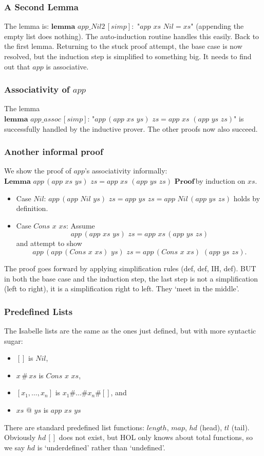 \documentclass{article}
\newcommand{\qq}{\texttt{"}}
\begin{document}
\subsubsection*{A Second Lemma}
The lemma is:
$\textbf{lemma}\,\,app\_Nil2\,[simp]:\,\,\qq app\,\,xs\,\,Nil=xs\qq $
(appending the empty list does nothing). The auto-induction routine handles this easily. Back to the first lemma.
Returning to the stuck proof attempt, the base case is now resolved, but the induction step is simplified to something big. It needs to find out that $app$ is associative.
\subsubsection*{Associativity of $app$}
The lemma 
$\textbf{lemma}\,\,app\_assoc\,[simp]:\,\qq app\,(app\,\,xs\,\,ys)\,\,zs=app\,\,xs\,\,(app\,\,ys\,\,zs)\qq $
is successfully handled by the inductive prover. The other proofs now also succeed. 
\subsubsection*{Another informal proof}
We show the proof of $app$'s associativity informally:
$\textbf{Lemma}\,\,app\,(app\,\,xs\,\,ys)\,\,zs=app\,\,xs\,\,(app\,\,ys\,\,zs)$
$\textbf{Proof}\,$by induction on $xs$.
\begin{itemize}
\item Case $Nil$: $app\,(app\,\,Nil\,\,ys)\,\,zs=app\,\,ys\,\,zs = app\,\,Nil\,(app\,\,ys\,\,zs)$ holds by definition.
\item Case $Cons\,\,x\,\,xs$: Assume
$$app\,(app\,\,xs\,\,ys)\,\,zs = app\,\,xs\,(app\,\,ys\,\,zs)$$
and attempt to show
$$app\,(app\,(Cons\,\,x\,\,xs)\,\,ys)\,\,zs = app\,(Cons\,\,x\,\,xs)\,\,(app\,\,ys\,\,zs).$$
\end{itemize}
The proof goes forward by applying simplification rules (def, def, IH, def). BUT in both the base case and the induction step, the last step is not a simplification (left to right), it is a simplification right to left. They `meet in the middle'. 

\subsubsection{Predefined Lists}
The Isabelle lists are the same as the ones just defined, but with more syntactic sugar:
\begin{itemize}
\item $[]$ is $Nil$,
\item $x\,\#\,xs$ is $Cons\,\,x\,\,xs$,
\item $[x_{1},\ldots,x_{n}]$ is $x_{1}\#\ldots\#x_{n}\#[]$, and
\item $xs\,\,@\,\,ys$ is $app\,\,xs\,\,ys$
\end{itemize}
There are standard predefined list functions: $length$, $map$, $hd$ (head), $tl$ (tail). Obviously $hd\,[]$ does not exist, but HOL only knows about total functions, so we say $hd$ is `underdefined' rather than `undefined'.
\end{document}
